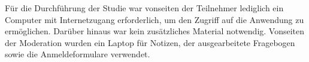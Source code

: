 Für die Durchführung der Studie war vonseiten der Teilnehmer lediglich ein Computer mit Internetzugang erforderlich, um den Zugriff auf die Anwendung zu ermöglichen. Darüber hinaus war kein zusätzliches Material notwendig.
Vonseiten der Moderation wurden ein Laptop für Notizen, der ausgearbeitete Fragebogen sowie die Anmeldeformulare verwendet.

 
 




